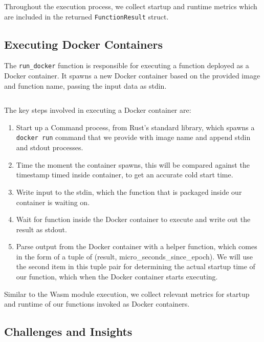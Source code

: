 \documentclass[
  table]{report}
\providecommand{\tightlist}{%
  \setlength{\itemsep}{0pt}\setlength{\parskip}{0pt}}
\begin{document}
Throughout the execution process, we collect startup and runtime metrics
which are included in the returned \texttt{FunctionResult} struct.

\subsection{Executing Docker Containers}
\label{sect:execute_docker}

The \texttt{run\_docker} function is responsible for executing a
function deployed as a Docker container. It spawns a new Docker
container based on the provided image and function name, passing the
input data as stdin.

\inputminted{rust}{assets/code/docker_runner.rs}

The key steps involved in executing a Docker container are:

\begin{enumerate}
\def\labelenumi{\arabic{enumi}.}
\tightlist
\item
  Start up a Command process, from Rust's standard library, which spawns
  a \texttt{docker\ run} command that we provide with image name and
  append stdin and stdout processes.
\item
  Time the moment the container spawns, this will be compared against
  the timestamp timed inside container, to get an accurate cold start
  time.
\item
  Write input to the stdin, which the function that is packaged inside
  our container is waiting on.
\item
  Wait for function inside the Docker container to execute and write out
  the result as stdout.
\item
  Parse output from the Docker container with a helper function, which
  comes in the form of a tuple of (result,
  micro\_seconds\_since\_epoch). We will use the second item in this
  tuple pair for determining the actual startup time of our function,
  which when the Docker container starts executing.
\end{enumerate}

Similar to the \ac{Wasm} module execution, we collect relevant metrics
for startup and runtime of our functions invoked as Docker containers.

\subsection{Challenges and Insights} 
\label{sect:6-challenge_insights}
\end{document}
